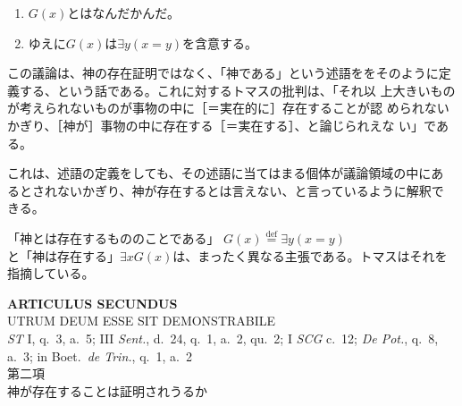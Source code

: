 \documentclass[10pt]{jsarticle} %
\begin{document}
\begin{enumerate}
 \item $G(x)$とはなんだかんだ。
 \item ゆえに$G(x)$は$\exists y(x=y)$を含意する。
\end{enumerate}



この議論は、神の存在証明ではなく、「神である」という述語ををそのように定
義する、という話である。これに対するトマスの批判は、「それ以
上大きいものが考えられないものが事物の中に［＝実在的に］存在することが認
められないかぎり、［神が］事物の中に存在する［＝実在する］、と論じられえな
 い」である。

 これは、述語の定義をしても、その述語に当てはまる個体が議論領域の中にあ
 るとされないかぎり、神が存在するとは言えない、と言っているように解釈で
 きる。

 「神とは存在するもののことである」 $G(x) \overset{\mathrm{def}}{=}\exists y(x=y)$と「神は存在する」$\exists xG(x)$は、まったく異なる主張である。トマスはそれを指摘している。
 



\newpage
{}
\begin{center}
 {\Large {\bf ARTICULUS SECUNDUS}}\\
 {\large UTRUM DEUM ESSE SIT DEMONSTRABILE}\\
 {\footnotesize {\it ST} I, q.~3, a.~5; III {\it Sent.}, d.~24, q.~1,
 a.~2, qu.~2; I {\it SCG} c.~12; {\it De Pot.}, q.~8, a.~3; in
 Boet.~{\it de Trin.}, q.~1, a.~2}\\
 {\Large 第二項\\神が存在することは証明されうるか}
\end{center}
\end{document}
